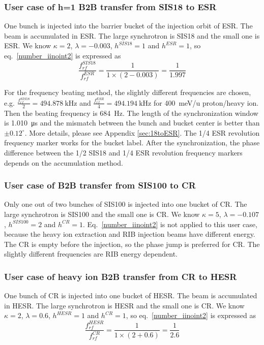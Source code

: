 \subsubsection{User case of h=1 B2B transfer from SIS18 to ESR} 
One bunch is injected into the barrier bucket of the injection orbit of ESR. The beam is accumulated in ESR. The large synchrotron is SIS18 and the small one is ESR. We know $\kappa=2$, $\lambda=-0.003$, $h^{SIS18}=1$ and $h^{ESR}=1$, so eq.~\ref{number_iinoint2} is expressed as
\begin{equation}
\frac {f_{rf}^{SIS18}}{f_{rf}^{ESR}}= \frac {1 }{1 \times( 2- 0.003)}=\frac{1}{1.997}
\end{equation}

For the frequency beating method, the slightly different frequencies are chosen, e.g. $\frac{f_{rf}^{SIS18}}{2}=\SI{494.878}{\kHz}$ and $\frac{f_{rf}^{ESR}}{4}=\SI{494.194}{\kHz}$ for \SI{400}{meV/\atomicmassunit} proton/heavy ion. Then the beating frequency is \SI{684}{\Hz}. The length of the synchronization window is \SI{1.010}{\us} and the mismatch between the bunch and bucket center is better than $\pm0.12^\circ$. More details, please see Appendix \ref{sec:18toESR}. The 1/4 ESR revolution frequency marker works for the bucket label. After the synchronization, the phase difference between the 1/2 SIS18 and 1/4 ESR revolution frequency markers depends on the accumulation method.

\subsubsection{User case of B2B transfer from SIS100 to CR} 
Only one out of two bunches of SIS100 is injected into one bucket of CR. The large synchrotron is SIS100 and the small one is CR. We know $\kappa=5$, $\lambda=-0.107$, $h^{SIS100}=2$ and $h^{CR}=1$. Eq.~\ref{number_iinoint2} is not applied to this user case, because the heavy ion extraction and RIB injection beams have different energy. The CR is empty before the injection, so the phase jump is preferred for CR. The slightly different frequencies are RIB energy dependent.


\subsubsection{User case of heavy ion B2B transfer from CR to HESR} 

One bunch of CR is injected into one bucket of HESR. The beam is accumulated in HESR. The large synchrotron is HESR and the small one is CR. We know $\kappa=2$, $\lambda=0.6$, $h^{HESR}=1$ and $h^{CR}=1$, so eq.~\ref{number_iinoint2} is expressed as
\begin{equation}
\frac {f_{rf}^{HESR}}{f_{rf}^{CR}}= \frac {1}{1 \times(2+0.6)}=\frac{1}{2.6}
\end{equation}

